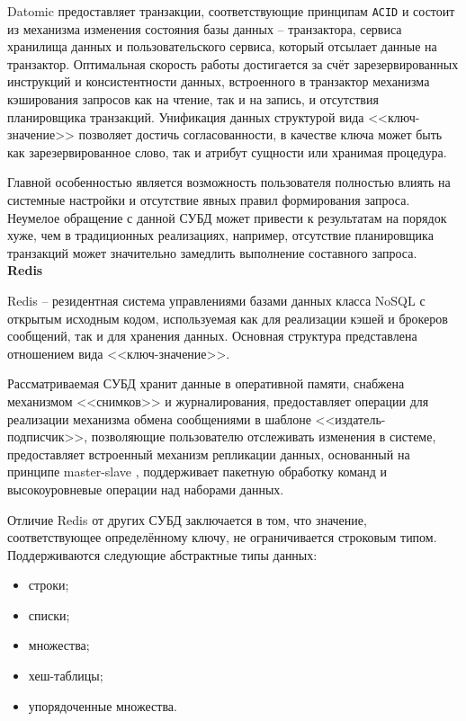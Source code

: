 Datomic предоставляет транзакции, соответствующие принципам \texttt{ACID} и состоит из механизма изменения состояния базы данных -- транзактора, сервиса хранилища данных и пользовательского сервиса, который отсылает данные на транзактор. Оптимальная скорость работы достигается за счёт зарезервированных инструкций и консистентности данных, встроенного в транзактор механизма кэширования запросов как на чтение, так и на запись, и отсутствия планировщика транзакций. Унификация данных структурой вида <<ключ-значение>> позволяет достичь согласованности, в качестве ключа может быть как зарезервированное слово, так и атрибут сущности или хранимая процедура.

Главной особенностью является возможность пользователя полностью влиять на системные настройки и отсутствие явных правил формирования запроса. Неумелое обращение с данной СУБД может привести к результатам на порядок хуже, чем в традиционных реализациях, например, отсутствие планировщика транзакций может значительно замедлить выполнение составного запроса.\\

\noindent\textbf{Redis}

Redis \cite{redis} -- резидентная система управлениями базами данных класса NoSQL с открытым исходным кодом, используемая как для реализации кэшей и брокеров сообщений, так и для хранения данных. Основная структура представлена отношением вида <<ключ-значение>>.

Рассматриваемая СУБД хранит данные в оперативной памяти, снабжена механизмом <<снимков>> и журналирования, предоставляет операции для реализации механизма обмена сообщениями в шаблоне <<издатель-подписчик>>, позволяющие пользователю отслеживать изменения в системе, предоставляет встроенный механизм репликации данных, основанный на принципе master-slave \cite{master-slave}, поддерживает пакетную обработку команд и высокоуровневые операции над наборами данных.

Отличие Redis от других СУБД заключается в том, что значение, соответствующее определённому ключу, не ограничивается строковым типом. Поддерживаются следующие абстрактные типы данных:
\begin{itemize}
	\item строки;
	\item списки;
	\item множества;
	\item хеш-таблицы;
	\item упорядоченные множества.
\end{itemize}

